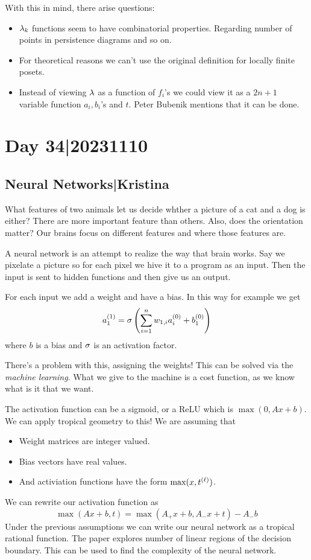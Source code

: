 \documentclass[12pt]{memoir}
\begin{document}
With this in mind, there arise questions:
\begin{itemize}
    \item $\lambda_k$ functions seem to have combinatorial properties. Regarding number of points in persistence diagrams and so on.
    \item For theoretical reasons we can't use the original definition for locally finite posets.
    \item Instead of viewing $\lambda$ as a function of $f_i$'s we could view it as a $2n+1$ variable function $a_i,b_i$'s and $t$. Peter Bubenik mentions that it can be done. 
\end{itemize}

\section{Day 34|20231110}
\subsection{Neural Networks|Kristina}

\begin{Ex}
    What features of two animals let us decide whther a picture of a cat and a dog is either? There are more important feature than others. Also, does the orientation matter? Our brains focus on different features and where those features are.
\end{Ex}

A neural network is an attempt to realize the way that brain works. Say we pixelate a picture so for each pixel we hive it to a program as an input. Then the input is sent to hidden functions and then give us an output.\par 
For each input we add a weight and have a bias. In this way for example we get 
$$a_1^{(1)}=\sigma\left(\sum_{i=1}^n w_{1,i}a_i^{(0)}+b_1^{(0)}\right)$$
where $b$ is a bias and $\sigma$ is an activation factor.\par 
There's a problem with this, assigning the weights! This can be solved via the \emph{machine learning}. What we give to the machine is a cost function, as we know what is it that we want.\par 
The activation function can be a sigmoid, or a ReLU which is $\max(0,Ax+b)$. We can apply tropical geometry to this! We are assuming that 
\begin{itemize}
    \item Weight matrices are integer valued.
    \item Bias vectors have real values.
    \item And activiation functions have the form $\max(x,t^{(\ell)})$.
\end{itemize}
We can rewrite our activation function as 
$$\max(Ax+b,t)=\max(A_+x+b,A_-x+t)-A_-b$$
Under the previous assumptions we can write our neural network as a tropical rational function. The paper explores number of linear regions of the decision boundary. This can be used to find the complexity of the neural network.
\end{document}
